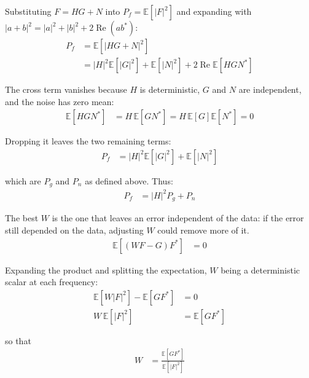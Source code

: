 \documentclass[10pt,twocolumn,letterpaper]{article}
\begin{document}
\noindent Substituting $F = H G + N$ into $P_{f} = \mathbb{E}\!\left[|F|^{2}\right]$ and
expanding with $\left|a + b\right|^{2} = \left|a\right|^{2} + \left|b\right|^{2}
+ 2\operatorname{Re}\left(a b^{*}\right)$:
\begin{align}
  P_{f} &= \mathbb{E}\!\left[\left|H G + N\right|^{2}\right] \nonumber \\
        &= \left|H\right|^{2}\mathbb{E}\!\left[\left|G\right|^{2}\right]
           + \mathbb{E}\!\left[\left|N\right|^{2}\right]
           + 2\operatorname{Re}\mathbb{E}\!\left[H G N^{*}\right]
\end{align}

\noindent The cross term vanishes because $H$ is deterministic, $G$ and $N$ are independent,
and the noise has zero mean:
\begin{align}
  \mathbb{E}\!\left[H G N^{*}\right]
    &= H\,\mathbb{E}\!\left[G N^{*}\right]
     = H\,\mathbb{E}\!\left[G\right]\mathbb{E}\!\left[N^{*}\right]
     = 0
\end{align}

\noindent Dropping it leaves the two remaining terms:
\begin{align}
  P_{f} &= \left|H\right|^{2}\mathbb{E}\!\left[\left|G\right|^{2}\right]
           + \mathbb{E}\!\left[\left|N\right|^{2}\right]
\end{align}

\noindent which are $P_{g}$ and $P_{n}$ as defined above. Thus:
\begin{align}
  P_{f} &= \left|H\right|^{2} P_{g} + P_{n}
\end{align}

\noindent The best $W$ is the one that leaves an error independent of the data: if the error
still depended on the data, adjusting $W$ could remove more of it.
\begin{align}
  \mathbb{E}\!\left[\left(W F - G\right) F^{*}\right] &= 0
\end{align}

\noindent Expanding the product and splitting the expectation, $W$ being a deterministic
scalar at each frequency:
\begin{align}
  \mathbb{E}\!\left[W \left|F\right|^{2}\right]
    - \mathbb{E}\!\left[G F^{*}\right] &= 0 \nonumber \\
  W \,\mathbb{E}\!\left[\left|F\right|^{2}\right]
    &= \mathbb{E}\!\left[G F^{*}\right]
\end{align}

\noindent so that
\begin{align}
  W &= \frac{\mathbb{E}\!\left[G F^{*}\right]}{\mathbb{E}\!\left[\left|F\right|^{2}\right]}
\end{align}
\end{document}
